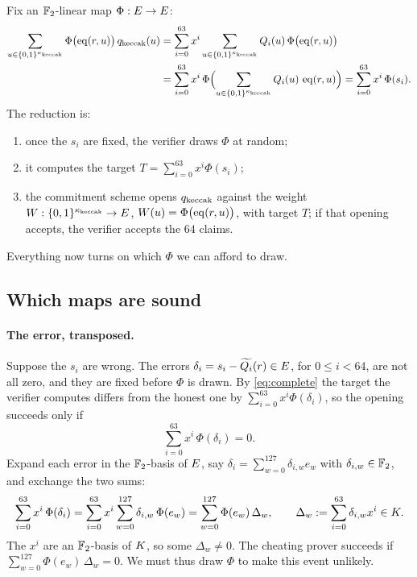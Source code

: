 Fix an $\mathbb{F}_2$-linear map $\Phi:E\to E$:
\begin{equation}
\begin{split}
\sum_{u\in\{0,1\}^{\kappa_{\mathrm{keccak}}}}\Phi\bigl(\operatorname{eq}(r,u)\bigr)\,q_{\mathrm{keccak}}(u)
&=\sum_{i=0}^{63}x^i\sum_{u\in\{0,1\}^{\kappa_{\mathrm{keccak}}}}Q_i(u)\,\Phi\bigl(\operatorname{eq}(r,u)\bigr)\\
&=\sum_{i=0}^{63}x^i\,\Phi\Bigl(\sum_{u\in\{0,1\}^{\kappa_{\mathrm{keccak}}}}Q_i(u)\,\operatorname{eq}(r,u)\Bigr)
=\sum_{i=0}^{63}x^i\,\Phi(s_i).
\end{split}
\label{eq:complete}
\end{equation}
The reduction is:
\begin{enumerate}
\item once the $s_i$ are fixed, the verifier draws $\Phi$ at random;
\item it computes the target $T=\sum_{i=0}^{63}x^i\Phi(s_i)$;
\item the commitment scheme opens $q_{\mathrm{keccak}}$ against the weight $W:\{0,1\}^{\kappa_{\mathrm{keccak}}}\to E$, $W(u)=\Phi\bigl(\operatorname{eq}(r,u)\bigr)$, with target $T$; if that opening accepts, the verifier accepts the $64$ claims.
\end{enumerate}
Everything now turns on which $\Phi$ we can afford to draw.

\subsection{Which maps are sound}\label{rs:sound-maps}

\paragraph{The error, transposed.} Suppose the $s_i$ are wrong. The errors $\delta_i=s_i-\widetilde{Q_i}(r)\in E$, for $0\le i<64$, are not all zero, and they are fixed before $\Phi$ is drawn. By \eqref{eq:complete} the target the verifier computes differs from the honest one by $\sum_{i=0}^{63}x^i\Phi(\delta_i)$, so the opening succeeds only if
\[
\sum_{i=0}^{63}x^i\,\Phi(\delta_i)=0.
\]
Expand each error in the $\mathbb{F}_2$-basis of $E$, say $\delta_i=\sum_{w=0}^{127}\delta_{i,w}e_w$ with $\delta_{i,w}\in\mathbb{F}_2$, and exchange the two sums:
\begin{equation}
\sum_{i=0}^{63}x^i\,\Phi(\delta_i)
=\sum_{i=0}^{63}x^i\sum_{w=0}^{127}\delta_{i,w}\,\Phi(e_w)
=\sum_{w=0}^{127}\Phi(e_w)\,\Delta_w,
\qquad
\Delta_w:=\sum_{i=0}^{63}\delta_{i,w}x^i\in K.
\label{eq:transpose}
\end{equation}
The $x^i$ are an $\mathbb{F}_2$-basis of $K$, so some $\Delta_w\neq0$. The cheating prover succeeds if $\sum_{w=0}^{127}\Phi(e_w)\,\Delta_w=0$. We must thus draw $\Phi$ to make this event unlikely.

